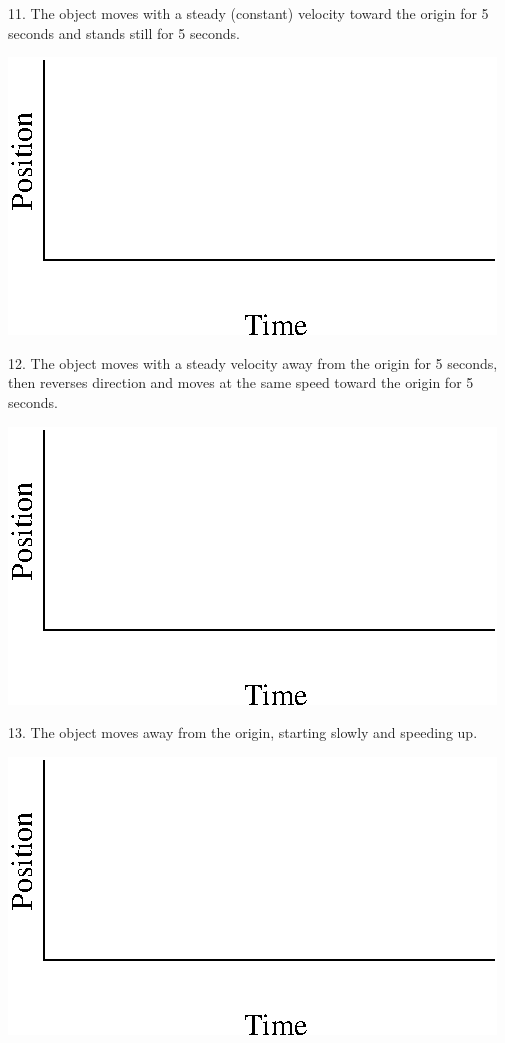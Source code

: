11. The object moves with a steady (constant) velocity toward the origin for
5 seconds and stands still for 5 seconds.

\vspace{0.3cm}
{\par\centering \includegraphics{position/position_fig13.eps} \par}
\vspace{0.3cm}

12. The object moves with a steady velocity away from the origin for 5 seconds,
then reverses direction and moves at the same speed toward the origin for 5
seconds.

\vspace{0.3cm}
{\par\centering \includegraphics{position/position_fig13.eps} \par}
\vspace{0.3cm}

13. The object moves away from the origin, starting slowly and speeding up.

\vspace{0.3cm}
{\par\centering \includegraphics{position/position_fig13.eps} \par}
\vspace{0.3cm}

